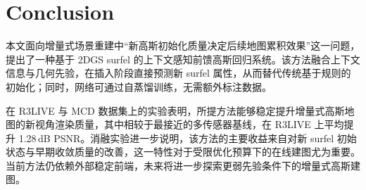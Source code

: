 
\section{Conclusion}

本文面向增量式场景重建中“新高斯初始化质量决定后续地图累积效果”这一问题，提出了一种基于 2DGS surfel 的上下文感知前馈高斯回归系统。该方法融合上下文信息与几何先验，在插入阶段直接预测新 surfel 属性，从而替代传统基于规则的初始化；同时，网络可通过自蒸馏训练，无需额外标注数据。

在 R3LIVE 与 MCD 数据集上的实验表明，所提方法能够稳定提升增量式高斯地图的新视角渲染质量，其中相较于最接近的多传感器基线，在 R3LIVE 上平均提升 1.28\,dB PSNR。消融实验进一步说明，该方法的主要收益来自对新 surfel 初始状态与早期收敛质量的改善，这一特性对于受限优化预算下的在线建图尤为重要。当前方法仍依赖外部稳定前端，未来将进一步探索更弱先验条件下的增量式高斯建图。
